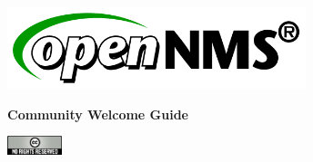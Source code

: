 %
%
%
%

\begin{titlepage}
    \begin{center}
        \includegraphics[width=0.65\textwidth]{images/opennms-logo.png}
    \end{center}
    \vspace{8em}
    \center
    \Huge{\textbf{Community Welcome Guide}}
    \vspace{15em}

    \begin{flushright}
        \includegraphics[width=0.12\textwidth]{images/cc-logo.png}
    \end{flushright}
\end{titlepage}